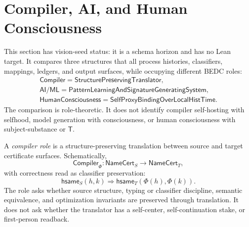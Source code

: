 \section{Compiler, AI, and Human Consciousness}
\label{sec:compiler-ai-human-consciousness-comparison}

\begin{remark}
\label{rem:compiler-ai-human-consciousness-vision-seed-status}
This section has vision-seed status: it is a schema horizon and has no
Lean target. It compares three structures that all process histories,
classifiers, mappings, ledgers, and output surfaces, while occupying
different BEDC roles:
$$
\begin{gathered}
\mathsf{Compiler}
=
\mathsf{StructurePreservingTranslator},\\
\mathsf{AI/ML}
=
\mathsf{PatternLearningAndSignatureGeneratingSystem},\\
\mathsf{HumanConsciousness}
=
\mathsf{SelfProxyBindingOverLocalHistTime}.
\end{gathered}
$$
The comparison is role-theoretic. It does not identify compiler
self-hosting with selfhood, model generation with consciousness, or human
consciousness with subject-substance or $\mathsf{T}$.
\end{remark}


\begin{definition}
\label{def:compiler-role-structure-preserving-translation}
A \emph{compiler role} is a structure-preserving translation between
source and target certificate surfaces. Schematically,
$$
\mathsf{Compiler}_{\Phi}:
\mathsf{NameCert}_{S}\to\mathsf{NameCert}_{T},
$$
with correctness read as classifier preservation:
$$
\mathsf{hsame}_{S}(h,k)
\Rightarrow
\mathsf{hsame}_{T}(\Phi(h),\Phi(k)).
$$
The role asks whether source structure, typing or classifier discipline,
semantic equivalence, and optimization invariants are preserved through
translation. It does not ask whether the translator has a self-center,
self-continuation stake, or first-person readback.
\end{definition}


